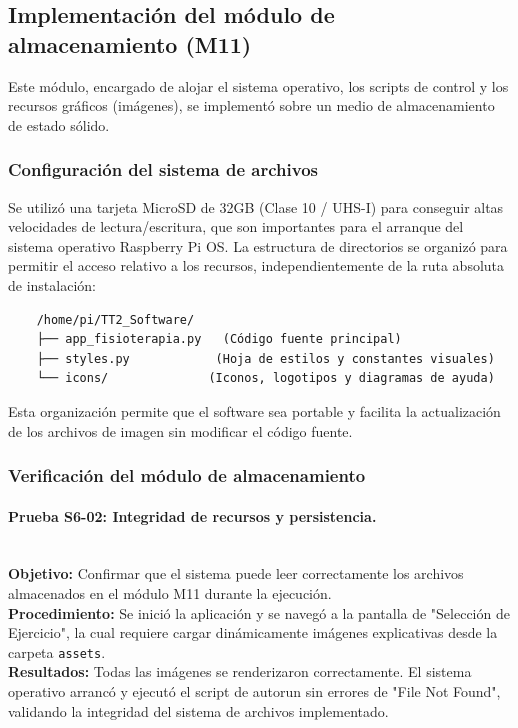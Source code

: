 \subsection{Implementación del módulo de almacenamiento (M11)}

Este módulo, encargado de alojar el sistema operativo, los scripts de control y los recursos gráficos (imágenes), se implementó sobre un medio de almacenamiento de estado sólido.

\subsubsection{Configuración del sistema de archivos}
Se utilizó una tarjeta MicroSD de 32GB (Clase 10 / UHS-I) para conseguir altas velocidades de lectura/escritura, que son importantes para el arranque del sistema operativo Raspberry Pi OS.
La estructura de directorios se organizó para permitir el acceso relativo a los recursos, independientemente de la ruta absoluta de instalación:
\begin{verbatim}
	/home/pi/TT2_Software/
	├── app_fisioterapia.py   (Código fuente principal)
	├── styles.py            (Hoja de estilos y constantes visuales)
	└── icons/              (Iconos, logotipos y diagramas de ayuda)
\end{verbatim}

Esta organización permite que el software sea portable y facilita la actualización de los archivos de imagen sin modificar el código fuente.

\subsubsection{Verificación del módulo de almacenamiento}
\paragraph*{Prueba S6-02: Integridad de recursos y persistencia.}\mbox{}\\
\textbf{Objetivo:} Confirmar que el sistema puede leer correctamente los archivos almacenados en el módulo M11 durante la ejecución.
\\
\textbf{Procedimiento:} Se inició la aplicación y se navegó a la pantalla de "Selección de Ejercicio", la cual requiere cargar dinámicamente imágenes explicativas desde la carpeta \texttt{assets}.
\\
\textbf{Resultados:} Todas las imágenes se renderizaron correctamente. El sistema operativo arrancó y ejecutó el script de autorun sin errores de "File Not Found", validando la integridad del sistema de archivos implementado.